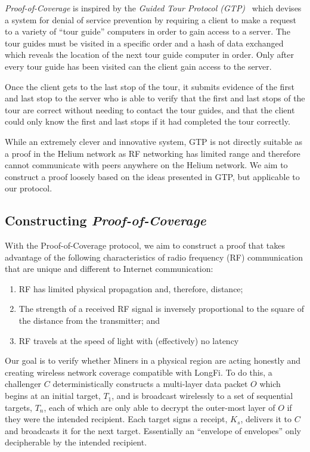 \documentclass[10pt, nonatbib, nocopyrightspace, reprint]{sigplanconf}
\begin{document}
\emph{Proof-of-Coverage} is inspired by the \emph{Guided Tour Protocol (GTP)}~\cite{gtp} which devises a system for denial of service prevention by requiring a client to make a request to a variety of ``tour guide'' computers in order to gain access to a server. The tour guides must be visited in a specific order and a hash of data exchanged which reveals the location of the next tour guide computer in order. Only after every tour guide has been visited can the client gain access to the server.

Once the client gets to the last stop of the tour, it submits evidence of the first and last stop to the server who is able to verify that the first and last stops of the tour are correct without needing to contact the tour guides, and that the client could only know the first and last stops if it had completed the tour correctly.

While an extremely clever and innovative system, GTP is not directly suitable as a proof in the Helium network as RF networking has limited range and therefore cannot communicate with peers anywhere on the Helium network. We aim to construct a proof loosely based on the ideas presented in GTP, but applicable to our protocol.

\subsection{Constructing \emph{Proof-of-Coverage}}

With the Proof-of-Coverage protocol, we aim to construct a proof that takes advantage of the following characteristics of radio frequency (RF) communication that are unique and different to Internet communication:

\begin{enumerate}
    \item RF has limited physical propagation and, therefore, distance;
    \item The strength of a received RF signal is inversely proportional to the square of the distance from the transmitter; and
    \item RF travels at the speed of light with (effectively) no latency
\end{enumerate}

Our goal is to verify whether Miners in a physical region are acting honestly and creating wireless network coverage compatible with LongFi. To do this, a challenger $C$ deterministically constructs a multi-layer data packet $O$ which begins at an initial target, $T_1$, and is broadcast wirelessly to a set of sequential targets, $T_n$, each of which are only able to decrypt the outer-most layer of $O$ if they were the intended recipient. Each target signs a receipt, $K_s$, delivers it to $C$ and broadcasts it for the next target. Essentially an ``envelope of envelopes'' only decipherable by the intended recipient.
\end{document}
